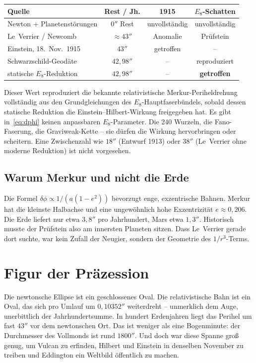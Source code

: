 \documentclass[11pt,a4paper]{article}
\theoremstyle{definition}
\theoremstyle{remark}
\newcommand{\dphi}{\delta\phi}
\begin{document}
\begin{center}
{\small
\begin{tabular}{@{}lccc@{}}
\toprule
Quelle & Rest / Jh. & 1915 & \(E_8\)-Schatten \\
\midrule
Newton + Planetenstörungen & \(0''\) Rest & unvollständig & unvollständig \\
Le~Verrier / Newcomb & \(\approx 43''\) & Anomalie & Prüfstein \\
Einstein, 18.~Nov.~1915 & \(43''\) & getroffen & -- \\
Schwarzschild-Geodäte & \(42{,}98''\) & -- & reproduziert \\
statische \(E_8\)-Reduktion & \(42{,}98''\) & -- & \textbf{getroffen} \\
\bottomrule
\end{tabular}}
\end{center}

\vspace{0.5em}
Dieser Wert reproduziert die bekannte relativistische Merkur-Periheldrehung vollständig aus den Grundgleichungen des \(E_8\)-Hauptfaserbündels, sobald dessen statische Reduktion die Einstein--Hilbert-Wirkung freigegeben hat. Es gibt in~\eqref{eq:dphi} keinen anpassbaren \(E_8\)-Parameter. Die 240 Wurzeln, die Fano-Faserung, die Graviweak-Kette -- sie dürfen die Wirkung hervorbringen oder scheitern. Eine Zwischenzahl wie \(18''\) (Entwurf 1913) oder \(38''\) (Le~Verrier ohne moderne Reduktion) ist nicht vorgesehen.

\subsection{Warum Merkur und nicht die Erde}

Die Formel \(\dphi\propto 1/(a(1-e^2))\) bevorzugt enge, exzentrische Bahnen. Merkur hat die kleinste Halbachse und eine ungewöhnlich hohe Exzentrizität \(e\approx 0{,}206\). Die Erde liefert nur etwa \(3{,}8''\) pro Jahrhundert, Mars etwa \(1{,}3''\). Historisch musste der Prüfstein also am innersten Planeten sitzen. Dass Le~Verrier gerade dort suchte, war kein Zufall der Neugier, sondern der Geometrie des \(1/r^3\)-Terms.

\section{Figur der Präzession}

Die newtonsche Ellipse ist ein geschlossenes Oval. Die relativistische Bahn ist ein Oval, das sich pro Umlauf um \(0{,}10352''\) weiterdreht -- unmerklich dem Auge, unerbittlich der Jahrhundertsumme. In hundert Erdenjahren liegt das Perihel um fast \(43''\) vor dem newtonschen Ort. Das ist weniger als eine Bogenminute: der Durchmesser des Vollmonds ist rund \(1800''\). Und doch war diese Spanne groß genug, um Vulcan zu erfinden, Hilbert und Einstein in denselben November zu treiben und Eddington ein Weltbild öffentlich zu machen.
\end{document}
